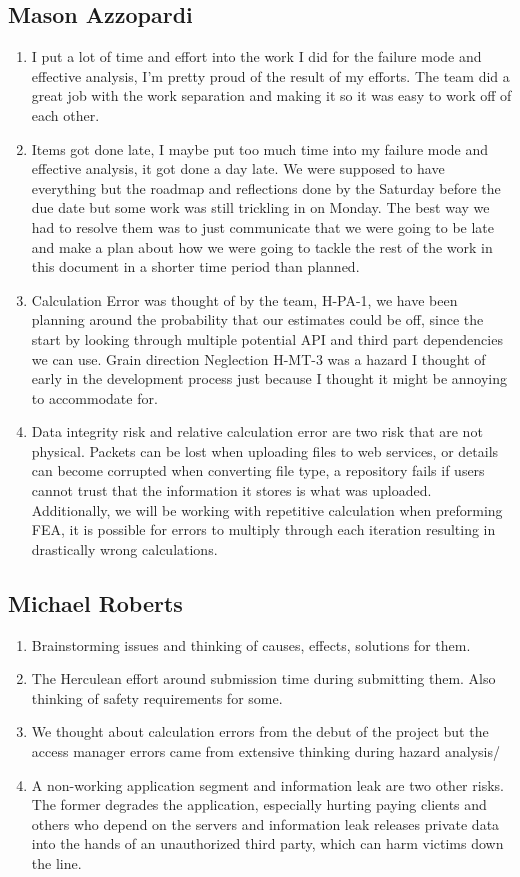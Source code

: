 \documentclass{article}
\begin{document}
\subsection*{Mason Azzopardi}
\begin{enumerate}
    \item I put a lot of time and effort into the work I did for the failure mode and effective analysis, I'm pretty proud of the result of my efforts. The team did a great job with the work separation and making it so it was easy to work off of each other.
    \item Items got done late, I maybe put too much time into my failure mode and effective analysis, it got done a day late. We were supposed to have everything but the roadmap and reflections done by the Saturday before the due date but some work was still trickling in on Monday. The best way we had to resolve them was to just communicate that we were going to be late and make a plan about how we were going to tackle the rest of the work in this document in a shorter time period than planned.
    \item Calculation Error was thought of by the team, H-PA-1, we have been planning around the probability that our estimates could be off, since the start by looking through multiple potential API and third part dependencies we can use. Grain direction Neglection H-MT-3 was a hazard I thought of early in the development process just because I thought it might be annoying to accommodate for.
    \item Data integrity risk and relative calculation error are two risk that are not physical. Packets can be lost when uploading files to web services, or details can become corrupted when converting file type, a repository fails if users cannot trust that the information it stores is what was uploaded. Additionally, we will be working with repetitive calculation when preforming FEA, it is possible for errors to multiply through each iteration resulting in drastically wrong calculations.
\end{enumerate}
\subsection*{Michael Roberts}
\begin{enumerate}
    \item Brainstorming issues and thinking of causes, effects, solutions for them.
    \item The Herculean effort around submission time during submitting them. Also thinking of safety requirements for some.
    \item We thought about calculation errors from the debut of the project but the access manager errors came from extensive thinking during hazard analysis/
    \item A non-working application segment and information leak are two other risks. The former degrades the application, especially
    hurting paying clients and others who depend on the servers and information leak releases private data into the hands of an unauthorized third party,
    which can harm victims down the line.
\end{enumerate}
\end{document}
